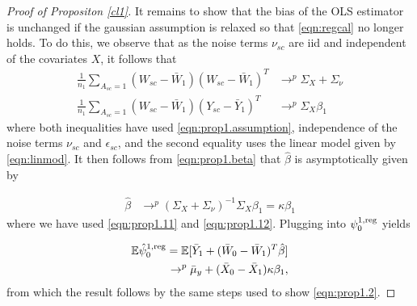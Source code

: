 \begin{proof}[Proof of Propositon \ref{cl1}]
It remains to show that the bias of the OLS estimator is unchanged if the gaussian assumption is relaxed so that \eqref{eqn:regcal} no longer holds. To do this, we observe that as the noise terms $\nu_{sc}$ are iid and independent of the covariates $X$, it follows that
\begin{align}
    \frac{1}{n_1} \sum_{A_{sc}=1} (W_{sc} - \bar{W}_1)(W_{sc} - \bar{W}_1)^T & \rightarrow^p \Sigma_X + \Sigma_{\nu} \label{eqn:prop1.11}\\
    \frac{1}{n_1} \sum_{A_{sc}=1} (W_{sc} - \bar{W}_1)(Y_{sc} - \bar{Y}_1)^T & \rightarrow^p \Sigma_X \beta_1 \label{eqn:prop1.12}
\end{align}
where both inequalities have used \eqref{eqn:prop1.assumption}, independence of the noise terms $\nu_{sc}$ and $\epsilon_{sc}$, and the second equality uses the linear model given by \eqref{eqn:linmod}. It then follows from \eqref{eqn:prop1.beta} that $\hat{\beta}$ is asymptotically given by

    \begin{align*}
    \hat{\beta} & \rightarrow^p  (\Sigma_X + \Sigma_\nu)^{-1}\Sigma_X \beta_1 = \kappa \beta_1 
    \end{align*}
where we have used \eqref{eqn:prop1.11} and \eqref{eqn:prop1.12}. Plugging into $\psi_0^{1,\textup{reg}}$ yields

\begin{align*}    
    \mathbb{E}\hat{\psi}_0^{1,\textup{reg}} = \mathbb{E}[ \bar{Y}_1 + (\bar{W}_0 - \bar{W}_1)^T \hat{\beta}] \\
    \rightarrow^p  \bar{\mu}_y + (\bar{X}_0 - \bar{X}_1)\kappa \beta_1,
\end{align*}
from which the result follows by the same steps used to show \eqref{eqn:prop1.2}.



\end{proof}
